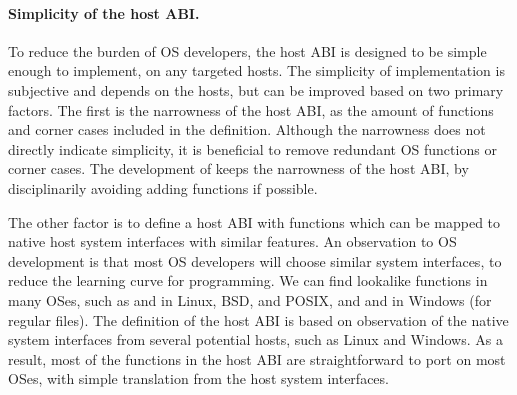 \paragraph{Simplicity of the host ABI.}
To reduce the burden of OS developers, the host ABI is designed to be simple enough to implement, on any targeted hosts.
The simplicity of implementation is subjective and depends on the hosts,
but can be improved based on two primary factors.
The first is the narrowness of the host ABI, as the amount of functions and corner cases
included in the definition.
Although the narrowness does not directly indicate simplicity, it is beneficial to remove
redundant OS functions or corner cases.
The development of \graphene{} keeps the narrowness of the host ABI, by disciplinarily avoiding adding functions if possible.

The other factor is to define a host ABI with functions which can be mapped to native host system interfaces with similar features.
An observation to OS development is that
most OS developers will choose similar system interfaces,
to reduce the learning curve for programming.
We can find lookalike functions in many OSes, such as  and  in Linux, BSD, and POSIX, and  and  in Windows (for regular files).
The definition of the host ABI
is based on observation of the native system interfaces from several potential hosts,
such as Linux and Windows.
As a result, most of the functions in the host ABI are straightforward to port on most OSes,
with simple translation from the host system interfaces.







